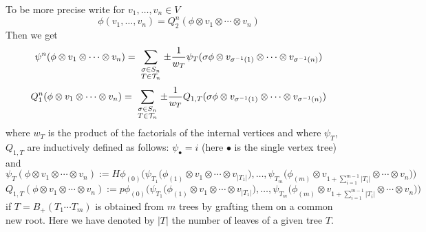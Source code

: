 \documentclass{amsart}
\numberwithin{equation}{section}
\let\cal\mathcal
\theoremstyle{definition}
\theoremstyle{remark}
\begin{document}
To be more precise
 write for $v_1,\ldots, v_n\in V$
\[
\phi(v_1,\ldots,v_n)=Q_2^n(\phi\otimes v_1\otimes\cdots \otimes v_n)
\]
Then we get 
\begin{equation}
\label{ref-A.8-51}
\psi^n(\phi\otimes v_1\otimes \cdots\otimes v_n)=\\
\sum_{\begin{smallmatrix}\sigma\in S_n
\\ T\in {{\cal T}}_n\end{smallmatrix}}\pm
\frac{1}{w_T}\psi_T(\sigma\phi\otimes v_{\sigma^{-1}(1)}\otimes\cdots\otimes  
v_{\sigma^{-1}(n)})
\end{equation}
\begin{equation}
\label{ref-A.9-52}
Q^n_1(\phi\otimes v_1\otimes \cdots\otimes v_n)=\\
\sum_{\begin{smallmatrix}\sigma\in S_n
\\ T\in {{\cal T}}_n\end{smallmatrix}}\pm
\frac{1}{w_T}Q_{1,T}(\sigma\phi\otimes v_{\sigma^{-1}(1)}\otimes\cdots\otimes  
v_{\sigma^{-1}(n)})
\end{equation}
where $w_T$ is the product of the factorials of the internal vertices
and where $\psi_T$, $Q_{1,T}$ are inductively defined as follows: 
$\psi_\bullet=i$ (here $\bullet$ is the single vertex tree) and 
$$
\psi_{T}(\phi\otimes v_1\otimes\cdots\otimes v_n):=
H\phi_{(0)}\Big(
\psi_{T_1}\big(\phi_{(1)}\otimes v_1\otimes\cdots\otimes v_{|T_1|}\big),\dots,
\psi_{T_m}\big(\phi_{(m)}\otimes v_{1+\sum_{i=1}^{m-1}|T_i|}\otimes\cdots\otimes v_n\big)\Big)
$$
$$
Q_{1,T}(\phi\otimes v_1\otimes\cdots\otimes v_n):=
p\phi_{(0)}\Big(
\psi_{T_1}\big(\phi_{(1)}\otimes v_1\otimes\cdots\otimes v_{|T_1|}\big),\dots,
\psi_{T_m}\big(\phi_{(m)}\otimes v_{1+\sum_{i=1}^{m-1}|T_i|}\otimes\cdots\otimes v_n\big)\Big)
$$
if $T=B_+(T_1\cdots T_m)$ is obtained from $m$ trees by grafting them on a common 
new root. Here we have denoted by $|T|$ the number of leaves of a given tree $T$. 
\end{document}
